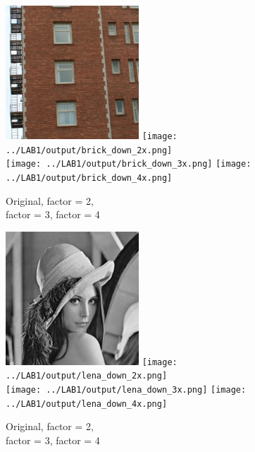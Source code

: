\begin{figure}[h!]
    \centering
    \includegraphics[width=5cm]{../LAB1/img/bricks.png}
    \texttt{[image: ../LAB1/output/brick\_down\_2x.png]} \\
    \texttt{[image: ../LAB1/output/brick\_down\_3x.png]}
    \texttt{[image: ../LAB1/output/brick\_down\_4x.png]}
    \caption{Original, factor = 2,\\ factor = 3, factor = 4}
\end{figure}


\begin{figure}[h!]
    \centering
    \includegraphics[width=5cm]{../LAB1/img/lena.png}
    \texttt{[image: ../LAB1/output/lena\_down\_2x.png]} \\
    \texttt{[image: ../LAB1/output/lena\_down\_3x.png]}
    \texttt{[image: ../LAB1/output/lena\_down\_4x.png]}
    \caption{Original, factor = 2,\\ factor = 3, factor = 4}
\end{figure}
